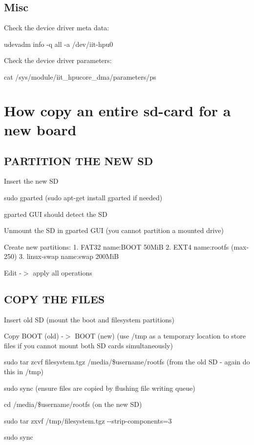  \subsection*{Misc}

Check the device driver meta data\+: 
\begin{DoxyCode}
udevadm info -q all -a /dev/iit-hpu0
\end{DoxyCode}
 Check the device driver parameters\+: 
\begin{DoxyCode}
cat /sys/module/iit\_hpucore\_dma/parameters/ps
\end{DoxyCode}


\section*{How copy an entire sd-\/card for a new board}

\subsection*{P\+A\+R\+T\+I\+T\+I\+ON T\+HE N\+EW SD}


\begin{DoxyItemize}
\item Insert the new SD
\item {\ttfamily sudo gparted} ({\ttfamily sudo apt-\/get install gparted} if needed)
\item {\ttfamily gparted} G\+UI should detect the SD
\item Unmount the SD in gparted G\+UI (you cannot partition a mounted drive)
\item Create new partitions\+: 1. F\+A\+T32 name\+:B\+O\+OT 50\+MiB 2. E\+X\+T4 name\+:rootfs (max-\/250) 3. linux-\/swap name\+:swap 200\+MiB
\item Edit -\/$>$ apply all operations
\end{DoxyItemize}

\subsection*{C\+O\+PY T\+HE F\+I\+L\+ES}


\begin{DoxyItemize}
\item Insert old SD (mount the boot and filesystem partitions)
\item Copy B\+O\+OT (old) -\/$>$ B\+O\+OT (new) (use {\ttfamily /tmp} as a temporary location to store files if you cannot mount both SD cards simultaneously)
\item {\ttfamily sudo tar zcvf filesystem.\+tgz /media/\$username/rootfs} (from the old SD -\/ again do this in {\ttfamily /tmp})
\item {\ttfamily sudo sync} (ensure files are copied by flushing file writing queue)
\item {\ttfamily cd /media/\$username/rootfs} (on the new SD)
\item {\ttfamily sudo tar zxvf /tmp/filesystem.tgz -\/-\/strip-\/components=3}
\item {\ttfamily sudo sync} 
\end{DoxyItemize}